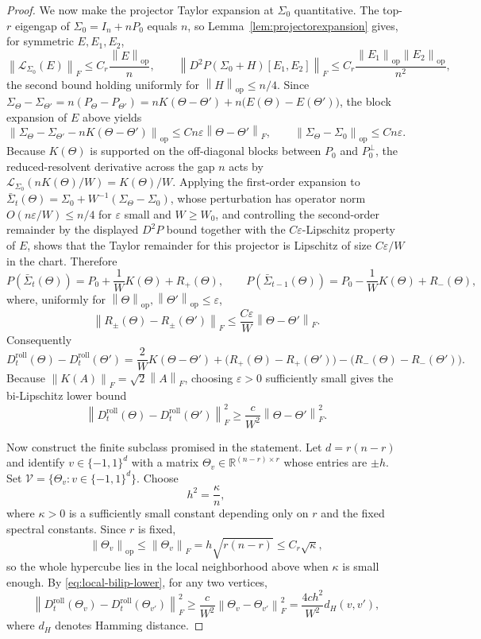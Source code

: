 \documentclass[11pt]{article}
\theoremstyle{tightplain}
\theoremstyle{tightdef}
\DeclareMathOperator{\op}{op}
\newcommand{\norm}[1]{\left\lVert #1 \right\rVert}
\begin{document}
\begin{proof}
We now make the projector Taylor expansion at $\Sigma_0$ quantitative. The
top-$r$ eigengap of $\Sigma_0=I_n+nP_0$ equals $n$, so
Lemma~\ref{lem:projectorexpansion} gives, for symmetric $E,E_1,E_2$,
\[
\norm{\mathcal L_{\Sigma_0}(E)}_F\le C_r\frac{\norm E_{\op}}{n},
\qquad
\norm{D^2P(\Sigma_0+H)[E_1,E_2]}_F\le C_r\frac{\norm{E_1}_{\op}\norm{E_2}_{\op}}{n^2},
\]
the second bound holding uniformly for $\norm H_{\op}\le n/4$. Since
$\Sigma_\Theta-\Sigma_{\Theta'}=n(P_\Theta-P_{\Theta'})
=nK(\Theta-\Theta')+n\bigl(E(\Theta)-E(\Theta')\bigr)$, the block expansion of $E$
above yields
\[
\norm{\Sigma_\Theta-\Sigma_{\Theta'}-nK(\Theta-\Theta')}_{\op}
\le Cn\varepsilon\norm{\Theta-\Theta'}_F,
\qquad
\norm{\Sigma_\Theta-\Sigma_0}_{\op}\le Cn\varepsilon .
\]
Because $K(\Theta)$ is supported on the off-diagonal blocks between $P_0$ and
$P_0^\perp$, the reduced-resolvent derivative across the gap $n$ acts by
$\mathcal L_{\Sigma_0}(nK(\Theta)/W)=K(\Theta)/W$. Applying the first-order
expansion to $\bar\Sigma_t(\Theta)=\Sigma_0+W^{-1}(\Sigma_\Theta-\Sigma_0)$, whose
perturbation has operator norm $O(n\varepsilon/W)\le n/4$ for $\varepsilon$ small
and $W\ge W_0$, and controlling the second-order remainder by the displayed
$D^2P$ bound together with the $C\varepsilon$-Lipschitz property of $E$, shows
that the Taylor remainder for this projector is Lipschitz of size $C\varepsilon/W$
in the chart. Therefore
\[
P(\bar\Sigma_t(\Theta))
=P_0+\frac1W K(\Theta)+R_+(\Theta),
\qquad
P(\bar\Sigma_{t-1}(\Theta))
=P_0-\frac1W K(\Theta)+R_-(\Theta),
\]
where, uniformly for $\norm{\Theta}_{\op},\norm{\Theta'}_{\op}\le\varepsilon$,
\[
\norm{R_\pm(\Theta)-R_\pm(\Theta')}_F
\le
\frac{C\varepsilon}{W}\norm{\Theta-\Theta'}_F .
\]
Consequently
\[
D_t^{\mathrm{roll}}(\Theta)-D_t^{\mathrm{roll}}(\Theta')
=\frac{2}{W}K(\Theta-\Theta')+
\bigl(R_+(\Theta)-R_+(\Theta')\bigr)
-
\bigl(R_-(\Theta)-R_-(\Theta')\bigr).
\]
Because $\norm{K(A)}_F=\sqrt2\norm A_F$, choosing $\varepsilon>0$ sufficiently
small gives the bi-Lipschitz lower bound
\begin{equation}\label{eq:local-bilip-lower}
\norm{
D_t^{\mathrm{roll}}(\Theta)-D_t^{\mathrm{roll}}(\Theta')
}_F^2
\ge
\frac c{W^2}\norm{\Theta-\Theta'}_F^2 .
\end{equation}

Now construct the finite subclass promised in the statement. Let $d=r(n-r)$ and
identify $v\in\{-1,1\}^d$ with a matrix
$\Theta_v\in\mathbb R^{(n-r)\times r}$ whose entries are $\pm h$. Set
$\mathcal V=\{\Theta_v:v\in\{-1,1\}^d\}$. Choose
\[
h^2=\frac{\kappa}{n},
\]
where $\kappa>0$ is a sufficiently small constant depending only on $r$ and the
fixed spectral constants. Since $r$ is fixed,
\[
\norm{\Theta_v}_{\op}
\le
\norm{\Theta_v}_F
=h\sqrt{r(n-r)}
\le
C_r\sqrt\kappa,
\]
so the whole hypercube lies in the local neighborhood above when $\kappa$ is
small enough. By \eqref{eq:local-bilip-lower}, for any two vertices,
\begin{equation}\label{eq:hamming-separation}
\norm{
D_t^{\mathrm{roll}}(\Theta_v)-D_t^{\mathrm{roll}}(\Theta_{v'})
}_F^2
\ge
\frac c{W^2}
\norm{\Theta_v-\Theta_{v'}}_F^2
=\frac{4c h^2}{W^2}d_H(v,v'),
\end{equation}
where $d_H$ denotes Hamming distance.


\end{proof}
\end{document}

